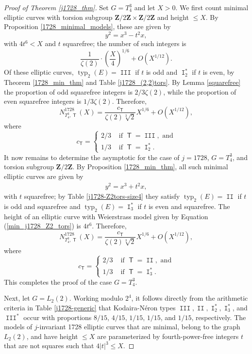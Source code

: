\documentclass{amsart}
\newcommand{\Z}{\mathbf{Z}}
\newcommand{\T}{\operatorname{\mathsf{T}}}
\DeclareMathOperator{\typ}{{typ}}
\DeclareMathOperator{\I}{\mathtt{I}}
\DeclareMathOperator{\II}{\mathtt{II}}
\DeclareMathOperator{\III}{\mathtt{III}}
\numberwithin{equation}{section}
\theoremstyle{plain}
\theoremstyle{remark}
\begin{document}
\begin{proof}[Proof of Theorem \ref{j1728_thm}]
Set $G = T_4^3$ and let $X >0$.  We first count minimal elliptic curves with torsion subgroup $\Z/2\Z \times \Z/2\Z$ and height $\leq X$.  By  Proposition \ref{1728_minimal_models}, these are given by 
\[
y^2 = x^3 -t^2 x,
\]
with $4t^6 <X$ and $t$ squarefree; the number of such integers is 
\[
\frac{1}{\zeta(2)} \cdot \left(\frac{X}{4}\right)^{1/6} + O(X^{1/12}).
\]
Of these elliptic curves, $\typ_2(E) = \III$ if $t$ is odd and $\I_2^*$ if $t$ is even, by Theorem \ref{1728_min_thm} and Table \ref{j1728_(2,2)tors}.  By Lemma \ref{squarefree} the proportion of odd squarefree integers is $2/3\zeta(2)$, while the proportion of even squarefree integers is $1/3\zeta(2)$.  Therefore, 
\[
N_{T_4^3,\T}^{1728}(X) =\frac{c_{\T}}{\zeta(2)\sqrt[3]{2}}X^{1/6} + O(X^{1/12}),
\]
where
\[
c_{\T} = \begin{cases} 2/3 & \text{ if } \T =   \III, \text{ and} \\
1/3 & \text{ if } \T = \I_2^*. \end{cases}
\]
It now remains to determine the asymptotic for the case of $j=1728$, $G = T_4^3$, and torsion subgroup $\Z/2\Z$.  By Proposition \ref{1728_min_thm}, all such minimal elliptic curves are given by 
\begin{align} \label{min_j1728_Z2_tors}
y^2 = x^3 + t^2x,
\end{align}
with $t$ squarefree; by Table  \ref{j1728-Z2tors-size4} they satisfy $\typ_2(E) = \II$ if $t$ is odd and squarefree and $\typ_2(E) = \I_3^*$ if $t$ is even and squarefree.   The height of an elliptic curve with Weierstrass model given by Equation (\ref{min_j1728_Z2_tors}) is $4t^6$.  Therefore, 
\[
N_{T_4^3,\T}^{1728}(X) =\frac{c_{\T}}{\zeta(2)\sqrt[3]{2}}X^{1/6} + O(X^{1/12}),
\]
where
\[
c_{\T} = \begin{cases} 2/3 & \text{ if } \T =   \II, \text{ and} \\
1/3 & \text{ if } \T = \I_3^*. \end{cases}
\]
This completes the proof of the case $G= T_4^3$.  

Next, let $G = L_2(2)$.  Working modulo $2^4$, it follows directly from the arithmetic criteria in Table \ref{j1728-generic} that Kodaira-N\'eron types $\III, \II, \I_2^*, \I_3^*$, and $\III^*$ occur with proportions $8/15$, $4/15$, $1/15$, $1/15$, and $1/15$, respectively.  The models of $j$-invariant 1728 elliptic curves that are minimal,  belong to the graph $L_2(2)$, and have height $\leq X$  are parameterized by fourth-power-free integers $t$ that are not squares such that $4|t|^3\leq X$.


\end{proof}
\end{document}
